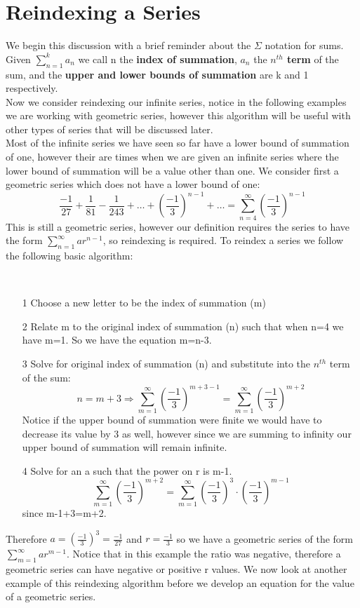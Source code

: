 \section*{Reindexing a Series}
We begin this discussion with a brief reminder about the $\Sigma$ notation
for sums.
Given $\displaystyle{\sum_{n=1}^{k} a_{n}}$ we call n the
\textbf{index of summation}, $a_{n}$ the \textbf{$n^{th}$ term} of
the sum, and the \textbf{upper and lower bounds of summation} are k
and 1
respectively.  \\

Now we consider reindexing our infinite series, notice in the
following examples we are working with geometric series, however
this algorithm will be useful with other
types of series that will be discussed later. \\

Most of the infinite series we have seen so far have a lower bound
of summation of one, however their are times when we are given an
infinite series where the lower bound of summation will be a value
other than one. We consider first a geometric series which does not
have a lower bound of one: $$ \frac{-1}{27} + \frac{1}{81} -
\frac{1}{243} + \ldots + (\frac{-1}{3})^{n-1} + \ldots =
\sum_{n=4}^{\infty} (\frac{-1}{3})^{n-1} $$ This is still a
geometric series, however our definition requires the series to have
the form $\displaystyle{\sum_{n=1}^{\infty} ar^{n-1}}$, so
reindexing is required. To reindex a series we follow the following
basic algorithm:
\begin{Algorithm}\ 
\begin{itemize}
\item[1] Choose a new letter to be the index of summation (m)
\item[2] Relate m to the original index of summation (n) such that when
n=4 we have m=1.  So we have the equation m=n-3.
\item[3] Solve for original index of summation (n) and substitute into
the $n^{th}$ term of the sum: $$ n=m+3 \Rightarrow
\sum_{m=1}^{\infty} (\frac{-1}{3})^{m+3-1} = \sum_{m=1}^{\infty}
(\frac{-1}{3})^{m+2} $$ Notice if the upper bound of summation were
finite we would have to decrease its value by 3 as well, however
since we are summing to infinity our upper bound of summation will
remain infinite.
\item[4] Solve for an a such that the power on r is m-1. $$
\sum_{m=1}^{\infty} (\frac{-1}{3})^{m+2} = \sum_{m=1}^{\infty}
(\frac{-1}{3})^{3} \cdot (\frac{-1}{3})^{m-1}$$ since m-1+3=m+2.
\end{itemize}
\end{Algorithm}
Therefore $a=(\frac{-1}{3})^3 = \frac{-1}{27}$ and $r=\frac{-1}{3}$
so we have a geometric series of the form
$\displaystyle{\sum_{m=1}^{\infty} ar^{m-1}}$.  Notice that in this
example the ratio was negative, therefore a geometric series can
have negative or positive r values. We now look at another example
of this reindexing algorithm before we develop an equation for the
value of a geometric series.

